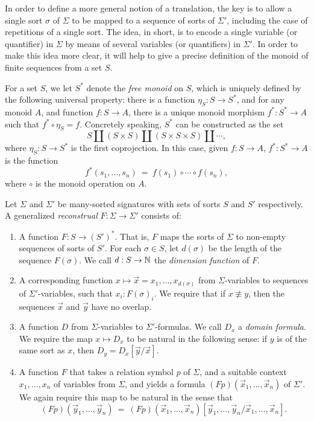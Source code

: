 
  In order to define a more general notion of a translation, the key
  is to allow a single sort $\sigma$ of $\Sigma$ to be mapped to a
  sequence of sorts of $\Sigma '$, including the case of repetitions
  of a single sort.  The idea, in short, is to encode a single
  variable (or quantifier) in $\Sigma$ by means of several variables
  (or quantifiers) in $\Sigma '$.  In order to make this idea more
  clear, it will help to give a precise definition of the monoid of
  finite sequences from a set $S$.

  \begin{defn} For a set $S$, we let $S^*$ denote the \emph{free
      monoid} on $S$, which is uniquely defined by the following
    universal property: there is a function $\eta _S:S\to S^*$, and
    for any monoid $A$, and function $f:S\to A$, there is a unique
    monoid morphism $f^*:S^*\to A$ such that $f^*\circ\eta _S=f$.
    Concretely speaking, $S^*$ can be constructed as the set
  \[ S \amalg (S\times S)\amalg (S\times S\times S) \amalg \cdots ,\]
  where $\eta _S:S\to S^*$ is the first coprojection.  In this case,
  given $f:S\to A$, $f^*:S^*\to A$ is the function
  \[ f^*(s_1,\dots ,s_n) \: = \: f(s_1)\circ \cdots\circ f(s_n) ,\]
  where $\circ$ is the monoid operation on $A$.  \end{defn}

\begin{defn} \label{gro} Let $\Sigma$ and $\Sigma '$ be many-sorted
  signatures with sets of sorts $S$ and $S'$ respectively.  A
  generalized \emph{reconstrual} $F:\Sigma \to \Sigma '$ consists of:
  \begin{enumerate}
  \item A function $F:S\to (S')^*$.  That is, $F$ maps the sorts of
    $\Sigma$ to non-empty sequences of sorts of $S'$.  For each
    $\sigma\in S$, let $d(\sigma )$ be the length of the sequence
    $F(\sigma )$.  We call $d:S\to\mathbb N$ the \emph{dimension function}
    of $F$.
  \item A corresponding function
    $x\mapsto \vec{x}=x_1,\dots ,x_{d(\sigma )}$ from
    $\Sigma$-variables to sequences of $\Sigma '$-variables, such that
    $x_i:F(\sigma )_i$.  We require that if $x\not\equiv y$, then the
    sequences $\vec{x}$ and $\vec{y}$ have no overlap.
  \item A function $D$ from $\Sigma$-variables to $\Sigma '$-formulas.
    We call $D_x$ a \emph{domain formula}.  We require the map
    $x\mapsto D_x$ to be natural in the following sense: if $y$ is of
    the same sort as $x$, then $D_y=D_x[\vec{y}/\vec{x}]$.
  \item A function $F$ that takes a relation symbol $p$ of $\Sigma$,
    and a suitable context $x_1,\dots ,x_n$ of variables from
    $\Sigma$, and yields a formula $(Fp)(\vec{x}_1,\dots ,\vec{x}_n)$
    of $\Sigma '$.  We again require this map to be natural in the
    sense that
    \[ (Fp)(\vec{y}_1,\dots ,\vec{y}_n) \: = \: (Fp)(\vec{x}_1,\dots
      ,\vec{x}_n)[\vec{y}_1,\dots ,\vec{y}_n/\vec{x}_1,\dots
      ,\vec{x}_n] .\] \end{enumerate}
\end{defn}


